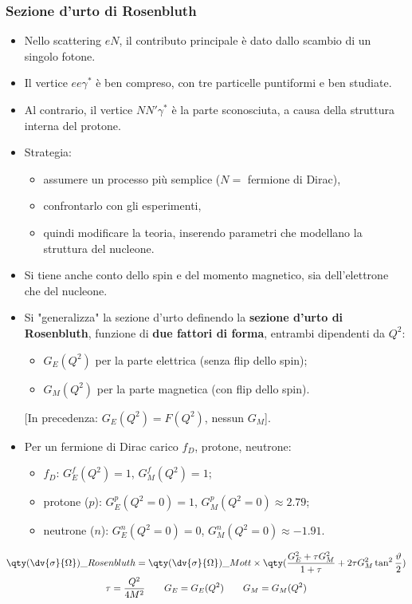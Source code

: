 \subsubsection{Sezione d'urto di Rosenbluth}
\begin{itemize}
    \item Nello scattering $eN$, il contributo principale è dato dallo scambio di un singolo fotone.
    \item Il vertice $ee\gamma^*$ è ben compreso, con tre particelle puntiformi e ben studiate.
    \item Al contrario, il vertice $NN'\gamma^*$ è la parte sconosciuta, a causa della struttura interna del protone.
    \item Strategia:
    \begin{itemize}
        \item assumere un processo più semplice ($N =$ fermione di Dirac),
        \item confrontarlo con gli esperimenti,
        \item quindi modificare la teoria, inserendo parametri che modellano la struttura del nucleone.
    \end{itemize}
    \item Si tiene anche conto dello spin e del momento magnetico, sia dell'elettrone che del nucleone.
    \item Si "generalizza" la sezione d'urto definendo la \textbf{sezione d'urto di Rosenbluth}, funzione di \textbf{due fattori di forma}, entrambi dipendenti da $Q^2$:
    \begin{itemize}
        \item $G_E(Q^2)$ per la parte elettrica (senza flip dello spin);
        \item $G_M(Q^2)$ per la parte magnetica (con flip dello spin).
    \end{itemize}
    [In precedenza: $G_E(Q^2) = F(Q^2)$, nessun $G_M$].
    \item Per un fermione di Dirac carico $f_D$, protone, neutrone:
    \begin{itemize}
        \item $f_D$: $G_E^f(Q^2) = 1$, $G_M^f(Q^2) = 1$;
        \item protone ($p$): $G_E^p(Q^2 = 0) = 1$, $G_M^p(Q^2 = 0) \approx 2.79$;
        \item neutrone ($n$): $G_E^n(Q^2 = 0) = 0$, $G_M^n(Q^2 = 0) \approx -1.91$.
    \end{itemize}
\end{itemize}
\begin{gather*}
    \qty(\dv{\sigma}{\Omega})\_{Rosenbluth}=\qty(\dv{\sigma}{\Omega})\_{Mott}\times\qty(\frac{G_E^2+\tau G_M^2}{1+\tau}+2\tau G_M^2\tan^2\frac\vartheta2)\\
    \tau=\frac{Q^2}{4M^2}\qquad G_E=G_E(Q^2)\qquad G_M=G_M(Q^2)
\end{gather*}
